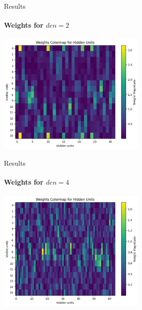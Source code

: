 \documentclass{beamer}
\begin{document}
\begin{frame}{Results}
\framesubtitle{Weights for $den = 2$}
\begin{center}
\includegraphics[height=6cm]{images/16spin_den2_jm1.png}
\end{center}
\end{frame}

\begin{frame}{Results}
\framesubtitle{Weights for $den = 4$}
\begin{center}
\includegraphics[height=6cm]{images/16spin_den4_jm1.png}
\end{center}
\end{frame}
\end{document}
